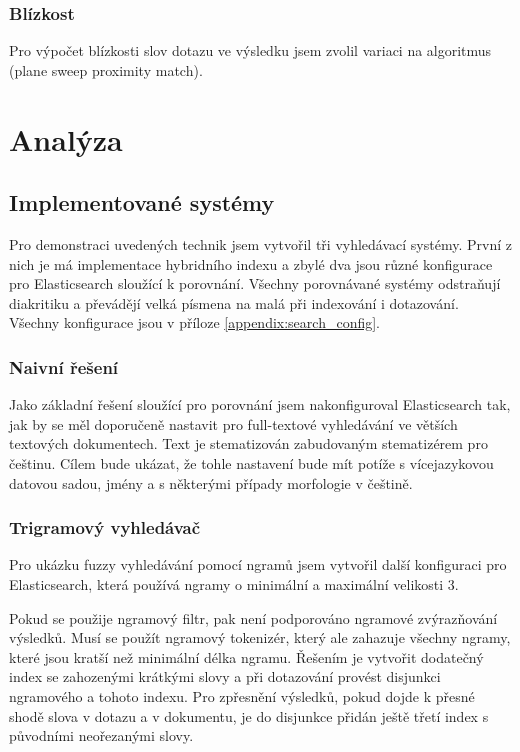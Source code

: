 \documentclass[12pt,letterpaper,oneside,openright]{book}
\begin{document}
\subsection{Blízkost}
Pro výpočet blízkosti slov dotazu ve výsledku jsem zvolil variaci na algoritmus
(plane sweep proximity match).


\chapter{Analýza}
\section{Implementované systémy}
Pro demonstraci uvedených technik jsem vytvořil tři vyhledávací systémy. První
z nich je má implementace hybridního indexu a zbylé dva jsou různé konfigurace
pro Elasticsearch sloužící k porovnání. Všechny porovnávané systémy odstraňují
diakritiku a převádějí velká písmena na malá při indexování i dotazování.
Všechny konfigurace jsou v příloze \ref{appendix:search_config}.

\subsection{Naivní řešení}
Jako základní řešení sloužící pro porovnání jsem nakonfiguroval Elasticsearch
tak, jak by se měl doporučeně nastavit pro full-textové vyhledávání ve větších
textových dokumentech. Text je stematizován zabudovaným stematizérem pro
češtinu. Cílem bude ukázat, že tohle nastavení bude mít potíže s vícejazykovou
datovou sadou, jmény a s některými případy morfologie v češtině.

\subsection{Trigramový vyhledávač}
Pro ukázku fuzzy vyhledávání pomocí ngramů jsem vytvořil další konfiguraci pro
Elasticsearch, která používá ngramy o minimální a maximální velikosti 3.

Pokud se použije ngramový filtr, pak není podporováno ngramové zvýrazňování
výsledků. Musí se použít ngramový tokenizér, který ale zahazuje všechny ngramy,
které jsou kratší než minimální délka ngramu. Řešením je vytvořit dodatečný
index se zahozenými krátkými slovy a při dotazování provést disjunkci
ngramového a tohoto indexu. Pro zpřesnění výsledků, pokud dojde k přesné shodě
slova v dotazu a v dokumentu, je do disjunkce přidán ještě třetí index s
původními neořezanými slovy.
\end{document}
